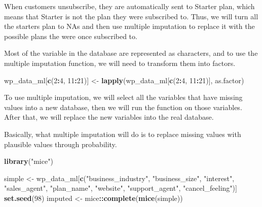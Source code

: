 \documentclass[]{article}
\newenvironment{Shaded}{\begin{snugshade}}{\end{snugshade}}
\newcommand{\KeywordTok}[1]{\textcolor[rgb]{0.13,0.29,0.53}{\textbf{#1}}}
\newcommand{\DecValTok}[1]{\textcolor[rgb]{0.00,0.00,0.81}{#1}}
\newcommand{\StringTok}[1]{\textcolor[rgb]{0.31,0.60,0.02}{#1}}
\newcommand{\OtherTok}[1]{\textcolor[rgb]{0.56,0.35,0.01}{#1}}
\newcommand{\OperatorTok}[1]{\textcolor[rgb]{0.81,0.36,0.00}{\textbf{#1}}}
\newcommand{\NormalTok}[1]{#1}
\begin{document}
When customers unsubscribe, they are automatically sent to Starter plan,
which means that Starter is not the plan they were subscribed to. Thus,
we will turn all the starters plan to NAs and then use multiple
imputation to replace it with the possible plans the were once
subscribed to.

\begin{Shaded}
\end{Shaded}

Most of the variable in the database are represented as characters, and
to use the multiple imputation function, we will need to transform them
into factors.

\begin{Shaded}
\begin{Highlighting}[]
\NormalTok{wp_data_ml[}\KeywordTok{c}\NormalTok{(}\DecValTok{2}\OperatorTok{:}\DecValTok{4}\NormalTok{, }\DecValTok{11}\OperatorTok{:}\DecValTok{21}\NormalTok{)] <-}\StringTok{ }\KeywordTok{lapply}\NormalTok{(wp_data_ml[}\KeywordTok{c}\NormalTok{(}\DecValTok{2}\OperatorTok{:}\DecValTok{4}\NormalTok{, }\DecValTok{11}\OperatorTok{:}\DecValTok{21}\NormalTok{)], as.factor)}
\end{Highlighting}
\end{Shaded}

To use multiple imputation, we will select all the variables that have
missing values into a new database, then we will run the function on
those variables. After that, we will replace the new variables into the
real database.

Basically, what multiple imputation will do is to replace missing values
with plausible values through probability.

\begin{Shaded}
\begin{Highlighting}[]
\KeywordTok{library}\NormalTok{(}\StringTok{"mice"}\NormalTok{)}
\end{Highlighting}
\end{Shaded}

\begin{Shaded}
\begin{Highlighting}[]
\NormalTok{simple <-}\StringTok{ }\NormalTok{wp_data_ml[}\KeywordTok{c}\NormalTok{(}\StringTok{"business_industry"}\NormalTok{, }\StringTok{"business_size"}\NormalTok{, }\StringTok{"interest"}\NormalTok{, }\StringTok{"sales_agent"}\NormalTok{, }\StringTok{"plan_name"}\NormalTok{, }\StringTok{"website"}\NormalTok{, }\StringTok{"support_agent"}\NormalTok{, }\StringTok{"cancel_feeling"}\NormalTok{)]}
\KeywordTok{set.seed}\NormalTok{(}\DecValTok{98}\NormalTok{)}
\NormalTok{imputed <-}\StringTok{ }\NormalTok{mice}\OperatorTok{::}\KeywordTok{complete}\NormalTok{(}\KeywordTok{mice}\NormalTok{(simple))}
\end{Highlighting}
\end{Shaded}
\end{document}
